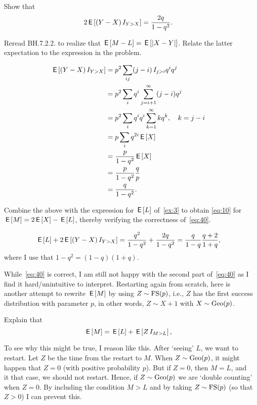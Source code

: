 \begin{exercise}
Show that
\begin{equation*}\label{eq:41}
2\,\mathsf{E}\left[(Y-X) \,I_{Y>X}\right] = \frac{2q} {1-q^{2}}.
\end{equation*}
\begin{hint}
  Reread BH.7.2.2. to realize that $\,\mathsf{E}\left[M-L\right] = \,\mathsf{E}\left[|X-Y|\right]$. Relate the latter expectation to the expression in the problem.
\end{hint}
\begin{solution}
  \begin{align*}
\,\mathsf{E}\left[(Y-X) \,I_{Y>X}\right]
&= p^2\sum_{ij} (j-i)\,I_{j>i} q^iq^j\\
&= p^2\sum_{i} q^i\sum_{j=i+1}^{\infty}(j-i)q^j\\
&= p^2\sum_{i} q^i q^{i}\sum_{k=1}^{\infty}kq^k, \quad k = j-i\\
&= p\sum_{i}  q^{2i}\,\mathsf{E}\left[X\right] \\
&= \frac{p}{1-q^{2}}\,\mathsf{E}\left[X\right] \\
&= \frac{p}{1-q^{2}}\frac q p \\
&= \frac{q}{1-q^{2}}.
  \end{align*}
\end{solution}
\end{exercise}

\begin{exercise}
Combine the above with the expression for $\,\mathsf{E}\left[L\right]$ of~\cref{ex:3} to obtain \cref{eq:10} for $\,\mathsf{E}\left[M\right] = 2\,\mathsf{E}\left[X\right] - \,\mathsf{E}\left[L\right]$, thereby verifying the correctness of~\cref{eq:40}.
\begin{hint}
\end{hint}
\begin{solution}
\begin{align*}
\,\mathsf{E}\left[L\right] + 2  \,\mathsf{E}\left[(Y-X) \,I_{Y>X}\right] = \frac{q^{2}}{1-q^2} +  \frac{2q}{1-q^{2}} = \frac q{1-q}\frac{q+2}{1+q},
\end{align*}
where I use that $1-q^{2}=(1-q)(1+q)$.
\end{solution}
\end{exercise}


While~\cref{eq:40} is correct, I am still not happy with the second part of~\eqref{eq:40} as I find it hard/unintuitive to interpret.
Restarting again from scratch, here is another attempt to rewrite $\,\mathsf{E}\left[M\right]$ by using $Z\sim \mathrm{FS}(p)$, i.e., $Z$ has the first success distribution with parameter $p$, in other words, $Z \sim X+1$ with $X\sim\mathrm{Geo}(p)$.

\begin{exercise}
Explain that
\begin{equation}
  \label{eq:44}
\,\mathsf{E}\left[M\right] = \,\mathsf{E}\left[L\right] + \,\mathsf{E}\left[ Z \,I_{M>L}\right],
\end{equation}
\begin{solution}
To see why this might be true, I reason like this.
After `seeing' $L$, we want to restart.
Let $Z$ be the time from the restart to $M$.
When $Z\sim \mathrm{Geo}(p)$, it might happen that $Z=0$ (with positive probability $p$).
But if $Z=0$, then $M=L$, and it that case, we should not restart.
Hence, if $Z\sim \mathrm{Geo}(p)$ we are `double counting' when $Z=0$.
By including the condition $M>L$ and by taking $Z\sim\mathrm{FS}(p)$ (so that $Z>0$) I can prevent this.
\end{solution}
\end{exercise}


